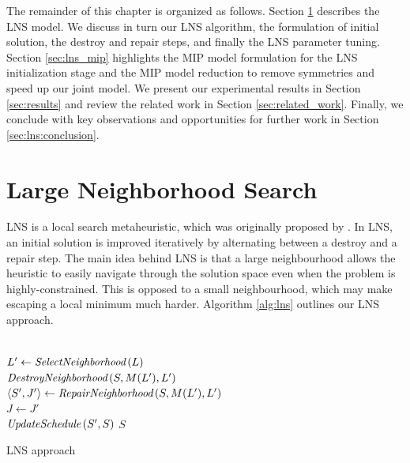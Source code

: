 The remainder of this chapter is organized as follows. 
Section \ref{sec:lns} describes the LNS model. We discuss in turn our LNS algorithm, the formulation of initial solution, the destroy and repair steps, and finally the LNS parameter tuning. 
Section \ref{sec:lns_mip} highlights the MIP model formulation for the LNS initialization stage and the MIP model reduction to remove symmetries and speed up our joint model. 
We present our experimental results in Section \ref{sec:results} and review the related work in Section \ref{sec:related_work}.
Finally, we conclude with key observations and opportunities for further work in Section \ref{sec:lns:conclusion}.

\section{Large Neighborhood Search}\label{sec:lns}

LNS is a local search metaheuristic, which was originally proposed by \cite{shaw1998using}. In LNS, an initial solution is improved iteratively by alternating between a destroy and a repair step. The main idea behind LNS is that a large neighbourhood allows the heuristic to easily navigate through the solution space even when the problem is highly-constrained. This is opposed to a small neighbourhood, which may make escaping a local minimum much harder. Algorithm \ref{alg:lns} outlines our LNS approach. 

\begin{algorithm}[ht!]
\small
{}
 \Indm
 \Initialize{}
 \\
 \Indm
 \Algorithm{}
 \Indp
 {
	$L' \gets \emph{SelectNeighborhood}\left(L\right)$ \\
	$\emph{DestroyNeighborhood}\left(S, M(L'), L' \right)$ \\
	$\langle S', J' \rangle \gets \emph{RepairNeighborhood}\left(S, M(L'), L' \right)$\\
	{
		$J \gets J' $\\
		$\emph{UpdateSchedule}\left(S', S \right)$
	}
 }
 \Return $S$
 \caption{LNS approach}
 \label{alg:lns}
\end{algorithm}

